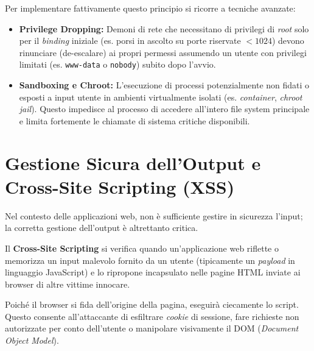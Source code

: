 Per implementare fattivamente questo principio si ricorre a tecniche avanzate:
\begin{itemize}
    \item \textbf{Privilege Dropping:} Demoni di rete che necessitano di privilegi di \textit{root} solo per il \textit{binding} iniziale (es. porsi in ascolto su porte riservate $< 1024$) devono rinunciare (de-escalare) ai propri permessi assumendo un utente con privilegi limitati (es. \texttt{www-data} o \texttt{nobody}) subito dopo l'avvio.
    \item \textbf{Sandboxing e Chroot:} L'esecuzione di processi potenzialmente non fidati o esposti a input utente in ambienti virtualmente isolati (es. \textit{container}, \textit{chroot jail}). Questo impedisce al processo di accedere all'intero file system principale e limita fortemente le chiamate di sistema critiche disponibili.
\end{itemize}

\section{Gestione Sicura dell'Output e Cross-Site Scripting (XSS)}
Nel contesto delle applicazioni web, non è sufficiente gestire in sicurezza l'input; la corretta gestione dell'output è altrettanto critica.

\begin{warnbox}
Il \textbf{Cross-Site Scripting} si verifica quando un'applicazione web riflette o memorizza un input malevolo fornito da un utente (tipicamente un \textit{payload} in linguaggio JavaScript) e lo ripropone incapsulato nelle pagine HTML inviate ai browser di altre vittime innocare. 

Poiché il browser si fida dell'origine della pagina, eseguirà ciecamente lo script. Questo consente all'attaccante di esfiltrare \textit{cookie} di sessione, fare richieste non autorizzate per conto dell'utente o manipolare visivamente il DOM (\textit{Document Object Model}).
\end{warnbox}

